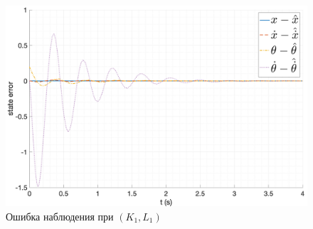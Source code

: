 \begin{figure}[ht!]
    \centering
    \includegraphics[width=\textwidth]{media/plots/nonmodal_observer_controller/kl_err_1.png}
    \caption{Ошибка наблюдения при $(K_1, L_1)$}
    \label{fig:KL_1_err}
\end{figure}
\FloatBarrier


